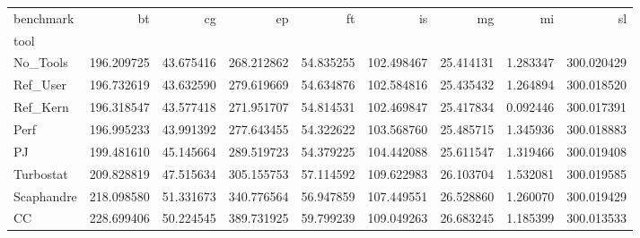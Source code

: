 \begin{tabular}{lrrrrrrrr}
\toprule
benchmark & bt & cg & ep & ft & is & mg & mi & sl \\
tool &  &  &  &  &  &  &  &  \\
\midrule
No_Tools & 196.209725 & 43.675416 & 268.212862 & 54.835255 & 102.498467 & 25.414131 & 1.283347 & 300.020429 \\
Ref_User & 196.732619 & 43.632590 & 279.619669 & 54.634876 & 102.584816 & 25.435432 & 1.264894 & 300.018520 \\
Ref_Kern & 196.318547 & 43.577418 & 271.951707 & 54.814531 & 102.469847 & 25.417834 & 0.092446 & 300.017391 \\
Perf & 196.995233 & 43.991392 & 277.643455 & 54.322622 & 103.568760 & 25.485715 & 1.345936 & 300.018883 \\
PJ & 199.481610 & 45.145664 & 289.519723 & 54.379225 & 104.442088 & 25.611547 & 1.319466 & 300.019408 \\
Turbostat & 209.828819 & 47.515634 & 305.155753 & 57.114592 & 109.622983 & 26.103704 & 1.532081 & 300.019585 \\
Scaphandre & 218.098580 & 51.331673 & 340.776564 & 56.947859 & 107.449551 & 26.528860 & 1.260070 & 300.019429 \\
CC & 228.699406 & 50.224545 & 389.731925 & 59.799239 & 109.049263 & 26.683245 & 1.185399 & 300.013533 \\
\bottomrule
\end{tabular}
